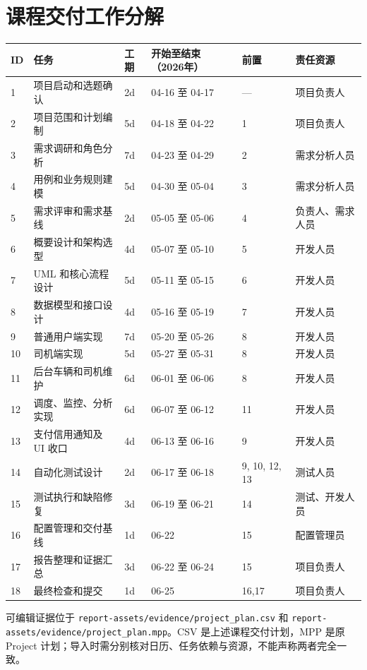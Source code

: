 \documentclass[UTF8,fontset=fandol,zihao=-4,oneside]{ctexrep}
\newcommand{\pathcode}[1]{\nolinkurl{#1}}
\begin{document}
\section{课程交付工作分解}
\small
\begin{longtable}{p{0.6cm}p{4cm}p{0.8cm}p{3.8cm}p{1.5cm}p{3cm}}
\toprule ID & 任务 & 工期 & 开始至结束（2026年） & 前置 & 责任资源 \\ \midrule
1 & 项目启动和选题确认 & 2d & 04-16 至 04-17 & — & 项目负责人 \\
2 & 项目范围和计划编制 & 5d & 04-18 至 04-22 & 1 & 项目负责人 \\
3 & 需求调研和角色分析 & 7d & 04-23 至 04-29 & 2 & 需求分析人员 \\
4 & 用例和业务规则建模 & 5d & 04-30 至 05-04 & 3 & 需求分析人员 \\
5 & 需求评审和需求基线 & 2d & 05-05 至 05-06 & 4 & 负责人、需求人员 \\
6 & 概要设计和架构选型 & 4d & 05-07 至 05-10 & 5 & 开发人员 \\
7 & UML 和核心流程设计 & 5d & 05-11 至 05-15 & 6 & 开发人员 \\
8 & 数据模型和接口设计 & 4d & 05-16 至 05-19 & 7 & 开发人员 \\
9 & 普通用户端实现 & 7d & 05-20 至 05-26 & 8 & 开发人员 \\
10 & 司机端实现 & 5d & 05-27 至 05-31 & 8 & 开发人员 \\
11 & 后台车辆和司机维护 & 6d & 06-01 至 06-06 & 8 & 开发人员 \\
12 & 调度、监控、分析实现 & 6d & 06-07 至 06-12 & 11 & 开发人员 \\
13 & 支付信用通知及 UI 收口 & 4d & 06-13 至 06-16 & 9 & 开发人员 \\
14 & 自动化测试设计 & 2d & 06-17 至 06-18 & 9, 10, 12, 13 & 测试人员 \\
15 & 测试执行和缺陷修复 & 3d & 06-19 至 06-21 & 14 & 测试、开发人员 \\
16 & 配置管理和交付基线 & 1d & 06-22 & 15 & 配置管理员 \\
17 & 报告整理和证据汇总 & 3d & 06-22 至 06-24 & 15 & 项目负责人 \\
18 & 最终检查和提交 & 1d & 06-25 & 16,17 & 项目负责人 \\
\bottomrule
\end{longtable}
\normalsize
可编辑证据位于 \pathcode{report-assets/evidence/project_plan.csv} 和 \pathcode{report-assets/evidence/project_plan.mpp}。CSV 是上述课程交付计划，MPP 是原 Project 计划；导入时需分别核对日历、任务依赖与资源，不能声称两者完全一致。
\end{document}
